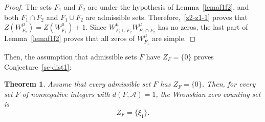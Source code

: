 \documentclass[10pt]{article}
\theoremstyle{plain}
\newtheorem{theorem}{Theorem}[section]
\theoremstyle{definition}
\numberwithin{equation}{section} %
\newcommand\Ad{\mathcal{A}}
\begin{document}
\begin{proof}
The sets $F_1$ and $F_2$ are under the hypothesis of Lemma~\ref{lemaf1f2}, and both $F_1 \cap F_2$ and $F_1 \cup F_2$ are admissible sets. Therefore,~\eqref{z2-z1-1} proves that $Z(W^\mu_{F_2}) = Z(W^\mu_{F_1}) + 1$. Since $W^\mu_{F_1 \cup F_2} W^\mu_{F_1 \cap F_2}$ has no zeros, the last part of Lemma~\ref{lemaf1f2} proves that all zeros of $W_{F_1}^\mu$ are simple.
\end{proof}

Then, the assumption that admissible sets $F$ have $Z_F=\{0\}$ proves Conjecture~\ref{sc-dist1}:

\begin{theorem}
\label{c1-c2}
Assume that every admissible set $F$ has $Z_F = \{0\}$. Then, for every set $F$ of nonnegative integers with $d(F,\Ad)=1$, the Wronskian zero counting set is
\begin{equation}
\label{num-m}
  Z_F = \{\xi_1 \} .
\end{equation}
\end{theorem}
\end{document}
